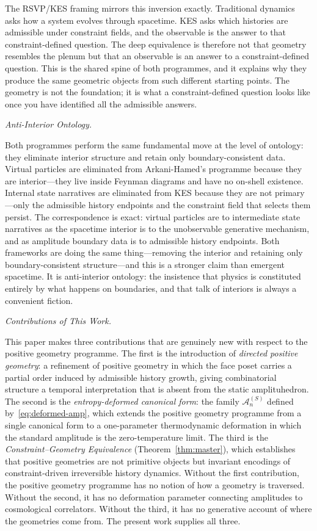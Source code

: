 \documentclass[11pt]{article}
\theoremstyle{plain}
\theoremstyle{definition}
\theoremstyle{remark}
\newcommand{\Sf}{S}
\begin{document}
The RSVP/KES framing mirrors this inversion exactly. Traditional dynamics asks how a system evolves through spacetime. KES asks which histories are admissible under constraint fields, and the observable is the answer to that constraint-defined question. The deep equivalence is therefore not that geometry resembles the plenum but that an observable is an answer to a constraint-defined question. This is the shared spine of both programmes, and it explains why they produce the same geometric objects from such different starting points. The geometry is not the foundation; it is what a constraint-defined question looks like once you have identified all the admissible answers.

\medskip\noindent\textit{Anti-Interior Ontology.}

Both programmes perform the same fundamental move at the level of ontology: they eliminate interior structure and retain only boundary-consistent data. Virtual particles are eliminated from Arkani-Hamed's programme because they are interior---they live inside Feynman diagrams and have no on-shell existence. Internal state narratives are eliminated from KES because they are not primary---only the admissible history endpoints and the constraint field that selects them persist. The correspondence is exact: virtual particles are to intermediate state narratives as the spacetime interior is to the unobservable generative mechanism, and as amplitude boundary data is to admissible history endpoints. Both frameworks are doing the same thing---removing the interior and retaining only boundary-consistent structure---and this is a stronger claim than emergent spacetime. It is anti-interior ontology: the insistence that physics is constituted entirely by what happens on boundaries, and that talk of interiors is always a convenient fiction.

\medskip\noindent\textit{Contributions of This Work.}

This paper makes three contributions that are genuinely new with respect to the positive geometry programme. The first is the introduction of \emph{directed positive geometry}: a refinement of positive geometry in which the face poset carries a partial order induced by admissible history growth, giving combinatorial structure a temporal interpretation that is absent from the static amplituhedron. The second is the \emph{entropy-deformed canonical form}: the family $\mathcal{A}_n^{(\Sf)}$ defined by~\eqref{eq:deformed-amp}, which extends the positive geometry programme from a single canonical form to a one-parameter thermodynamic deformation in which the standard amplitude is the zero-temperature limit. The third is the \emph{Constraint--Geometry Equivalence} (Theorem~\ref{thm:master}), which establishes that positive geometries are not primitive objects but invariant encodings of constraint-driven irreversible history dynamics. Without the first contribution, the positive geometry programme has no notion of how a geometry is traversed. Without the second, it has no deformation parameter connecting amplitudes to cosmological correlators. Without the third, it has no generative account of where the geometries come from. The present work supplies all three.
\end{document}
